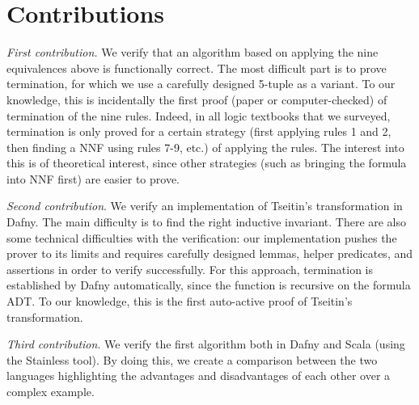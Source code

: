 \chapter*{Contributions} 

\emph{First contribution.} We verify that an algorithm based
on applying the nine equivalences above is functionally correct. The
most difficult part is to prove termination, for which we use a
carefully designed 5-tuple as a variant. To our knowledge, this is
incidentally the first proof (paper or computer-checked) of
termination of the nine rules. Indeed, in all logic textbooks that we
surveyed, termination is only proved for a certain strategy (first
applying rules 1 and 2, then finding a NNF using rules 7-9, etc.) of
applying the rules. The interest into this is of theoretical interest,
since other strategies (such as bringing the formula into NNF first)
are easier to prove.

\emph{Second contribution}. We verify an implementation of Tseitin’s
transformation in Dafny. The main difficulty is to find the right
inductive invariant. There are also some technical difficulties with
the verification: our implementation pushes the prover to its limits
and requires carefully designed lemmas, helper predicates, and
assertions in order to verify successfully. For this approach,
termination is established by Dafny automatically, since the function
is recursive on the formula ADT. To our knowledge, this is the first
auto-active proof of Tseitin's transformation.

\emph{Third contribution}. We verify the first algorithm both in Dafny and Scala (using the 
Stainless tool). By doing this, we create a comparison between 
the two languages highlighting the advantages and disadvantages of 
each other over a complex example.
